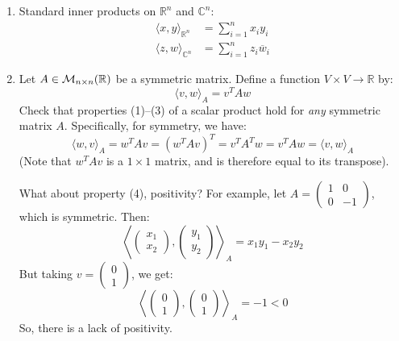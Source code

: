 \begin{example}
\leavevmode
\begin{enumerate}
    \item Standard inner products on $\mathbb{R}^n$ and $\mathbb{C}^n$:
    \begin{align*}
        \langle x, y \rangle_{\mathbb{R}^n} &= \sum_{i=1}^n x_i y_i \\
        \langle z, w \rangle_{\mathbb{C}^n} &= \sum_{i=1}^n z_i \overline{w}_i
    \end{align*}
    
    \item Let $A \in \mathcal{M}_{n \times n}(\mathbb{R})$ be a symmetric matrix. Define a function $V \times V \longrightarrow \mathbb{R}$ by:
    \[
        \langle v, w \rangle_A = v^T A w
    \]
    Check that properties (1)--(3) of a scalar product hold for \textit{any} symmetric matrix $A$. Specifically, for symmetry, we have:
    \[
        \langle w, v \rangle_A = w^T A v = (w^T A v)^T = v^T A^T w = v^T A w = \langle v, w \rangle_A
    \]
    (Note that $w^T A v$ is a $1 \times 1$ matrix, and is therefore equal to its transpose).
    
    What about property (4), positivity? For example, let $A = \begin{pmatrix} 1 & 0 \\ 0 & -1 \end{pmatrix}$, which is symmetric. Then:
    \[
        \left\langle \begin{pmatrix} x_1 \\ x_2 \end{pmatrix}, \begin{pmatrix} y_1 \\ y_2 \end{pmatrix} \right\rangle_A = x_1 y_1 - x_2 y_2
    \]
    But taking $v = \begin{pmatrix} 0 \\ 1 \end{pmatrix}$, we get:
    \[
        \left\langle \begin{pmatrix} 0 \\ 1 \end{pmatrix}, \begin{pmatrix} 0 \\ 1 \end{pmatrix} \right\rangle_A = -1 < 0
    \]
    So, there is a lack of positivity.
\end{enumerate}
\end{example}





